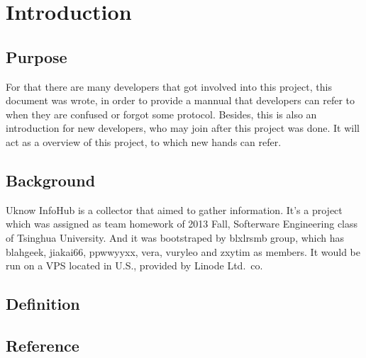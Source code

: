
\section{Introduction}
  \subsection{Purpose}
    For that there are many developers that got involved into this project,
    this document was wrote, in order to provide a mannual that developers can refer to
    when they are confused or forgot some protocol.
    Besides, this is also an introduction for new developers, who may join after this project was done.
    It will act as a overview of this project, to which new hands can refer.

  \subsection{Background}

    Uknow InfoHub is a collector that aimed to gather information.
    It's a project which was assigned as team homework of 2013 Fall, Softerware Engineering class of Tsinghua University.
    And it was bootstraped by blxlrsmb group, which has blahgeek, jiakai66, ppwwyyxx, vera, vuryleo and zxytim as members.
    It would be run on a VPS located in U.S., provided by Linode Ltd.\ co.

  \subsection{Definition}

  \subsection{Reference}

